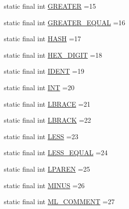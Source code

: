 \begin{DoxyCompactItemize}
\item 
static final int \hyperlink{classorg_1_1tzi_1_1use_1_1parser_1_1shell_1_1_shell_command_parser_a50b78262e4a35a39f7e4625e29456a71}{G\-R\-E\-A\-T\-E\-R} =15
\item 
static final int \hyperlink{classorg_1_1tzi_1_1use_1_1parser_1_1shell_1_1_shell_command_parser_a49580e9aee29ffe16a11d4a095f4cf91}{G\-R\-E\-A\-T\-E\-R\-\_\-\-E\-Q\-U\-A\-L} =16
\item 
static final int \hyperlink{classorg_1_1tzi_1_1use_1_1parser_1_1shell_1_1_shell_command_parser_a661e03180d956bf9207b9ed9fb712fea}{H\-A\-S\-H} =17
\item 
static final int \hyperlink{classorg_1_1tzi_1_1use_1_1parser_1_1shell_1_1_shell_command_parser_a4466fcaaf01b9922c7228df94cca39a1}{H\-E\-X\-\_\-\-D\-I\-G\-I\-T} =18
\item 
static final int \hyperlink{classorg_1_1tzi_1_1use_1_1parser_1_1shell_1_1_shell_command_parser_a1bafdcbce11d1457c4e1d3418e757af7}{I\-D\-E\-N\-T} =19
\item 
static final int \hyperlink{classorg_1_1tzi_1_1use_1_1parser_1_1shell_1_1_shell_command_parser_a1c059ae6c79c68e13522359f3723f86c}{I\-N\-T} =20
\item 
static final int \hyperlink{classorg_1_1tzi_1_1use_1_1parser_1_1shell_1_1_shell_command_parser_ad65fe24eaa32d3f810110650aee47824}{L\-B\-R\-A\-C\-E} =21
\item 
static final int \hyperlink{classorg_1_1tzi_1_1use_1_1parser_1_1shell_1_1_shell_command_parser_a0648955fb46ae6b761547d3793cd1143}{L\-B\-R\-A\-C\-K} =22
\item 
static final int \hyperlink{classorg_1_1tzi_1_1use_1_1parser_1_1shell_1_1_shell_command_parser_ad44f2f0e2da65e9aafabfa1b4f066593}{L\-E\-S\-S} =23
\item 
static final int \hyperlink{classorg_1_1tzi_1_1use_1_1parser_1_1shell_1_1_shell_command_parser_a9b9e63f65922009ba9a673c478c3b75b}{L\-E\-S\-S\-\_\-\-E\-Q\-U\-A\-L} =24
\item 
static final int \hyperlink{classorg_1_1tzi_1_1use_1_1parser_1_1shell_1_1_shell_command_parser_a280c7a2061886a0c94813f8e2fc982cb}{L\-P\-A\-R\-E\-N} =25
\item 
static final int \hyperlink{classorg_1_1tzi_1_1use_1_1parser_1_1shell_1_1_shell_command_parser_a9a07926f684c77d10b7e3ac4a217b97e}{M\-I\-N\-U\-S} =26
\item 
static final int \hyperlink{classorg_1_1tzi_1_1use_1_1parser_1_1shell_1_1_shell_command_parser_ad98901f07dae9cc9b4466ec391b59c50}{M\-L\-\_\-\-C\-O\-M\-M\-E\-N\-T} =27

\end{DoxyCompactItemize}
